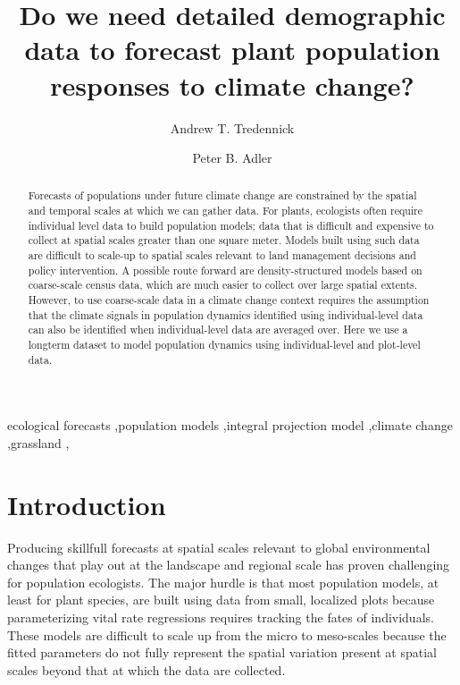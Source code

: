 \documentclass[author-year, 12pt,review]{components/elsarticle} %
\begin{document}
\begin{frontmatter}

  \title{Do we need detailed demographic data to forecast plant population
responses to climate change?}
    \author[usu]{Andrew T. Tredennick}
    \author[usu]{Peter B. Adler}
  
  
      \address[usu]{Department of Wildland Resources and the Ecology Center, Utah State
University, Logan, UT 84322, USA}    
  
  \begin{abstract}
  Forecasts of populations under future climate change are constrained by
  the spatial and temporal scales at which we can gather data. For plants,
  ecologists often require individual level data to build population
  models; data that is difficult and expensive to collect at spatial
  scales greater than one square meter. Models built using such data are
  difficult to scale-up to spatial scales relevant to land management
  decisions and policy intervention. A possible route forward are
  density-structured models based on coarse-scale census data, which are
  much easier to collect over large spatial extents. However, to use
  coarse-scale data in a climate change context requires the assumption
  that the climate signals in population dynamics identified using
  individual-level data can also be identified when individual-level data
  are averaged over. Here we use a longterm dataset to model population
  dynamics using individual-level and plot-level data.
  \end{abstract}
   \begin{keyword} ecological forecasts \sep population models \sep integral projection model \sep climate change \sep grassland \sep \end{keyword}
 \end{frontmatter}


\section{Introduction}\label{introduction}

Producing skillfull forecasts at spatial scales relevant to global
environmental changes that play out at the landscape and regional scale
has proven challenging for population ecologists. The major hurdle is
that most population models, at least for plant species, are built using
data from small, localized plots because parameterizing vital rate
regressions requires tracking the fates of individuals. These models are
difficult to scale up from the micro to meso-scales because the fitted
parameters do not fully represent the spatial variation present at
spatial scales beyond that at which the data are collected.
\end{document}
